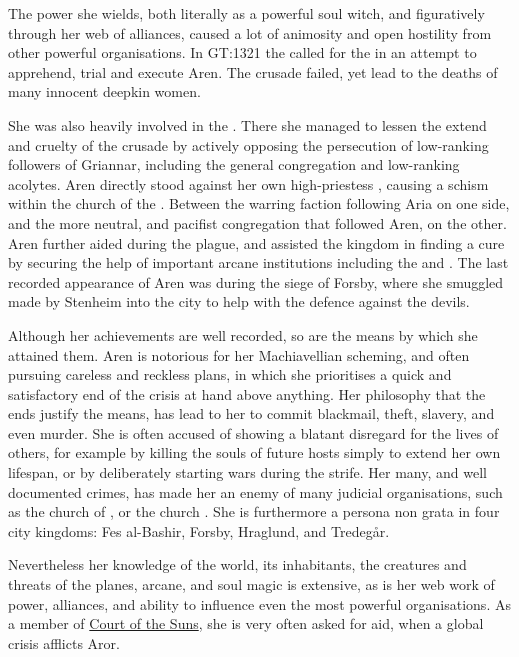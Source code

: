 The power she wields, both literally as a powerful soul witch, and
figuratively through her web of alliances, caused a lot of animosity and open
hostility from other powerful organisations. In GT:1321 the
 called for the 
in an attempt to apprehend, trial and execute Aren. The crusade failed, yet
lead to the deaths of many innocent deepkin women.

She was also heavily involved in the . There she
managed to lessen the extend and cruelty of the crusade by actively opposing
the persecution of low-ranking followers of Griannar, including the general
congregation and low-ranking acolytes. Aren directly stood against her own
high-priestess , causing a schism within the church of the
. Between the warring faction following Aria on one
side, and the more neutral, and pacifist congregation that followed Aren, on
the other. Aren further aided  during the plague, and
assisted the kingdom in finding a cure by securing the help of important
arcane institutions including the  and
. The last recorded appearance of Aren was
during the siege of Forsby, where she smuggled 
made by Stenheim into the city to help with the defence against the devils.

Although her achievements are well recorded, so are the means by which she
attained them. Aren is notorious for her Machiavellian scheming, and often
pursuing careless and reckless plans, in which she prioritises a quick and
satisfactory end of the crisis at hand above anything. Her philosophy that the
ends justify the means, has lead to her to commit blackmail, theft, slavery,
and even murder. She is often accused of showing a blatant disregard for the
lives of others, for example by killing the souls of future hosts simply to
extend her own lifespan, or by deliberately starting wars during the
strife. Her many, and well documented crimes, has made her an enemy of many
judicial organisations, such as the church of , or the church
. She is furthermore a persona non grata in four city
kingdoms: Fes al-Bashir, Forsby, Hraglund, and Tredegår.

Nevertheless her knowledge of the world, its inhabitants, the creatures and
threats of the planes, arcane, and soul magic is extensive, as is her web work
of power, alliances, and ability to influence even the most powerful
organisations. As a member of \hyperref[sec:Two Courts]{Court of the Suns},
she is very often asked for aid, when a global crisis afflicts Aror.

